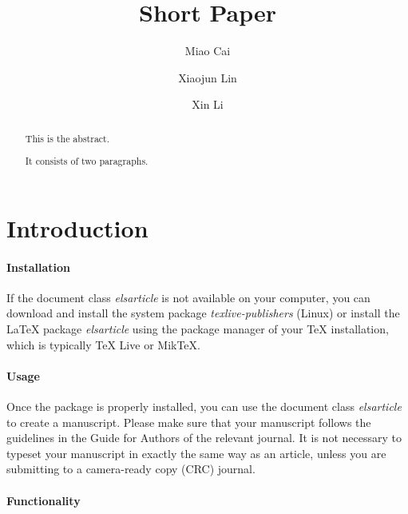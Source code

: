 \documentclass[]{elsarticle} %
\begin{document}
\begin{frontmatter}

  \title{Short Paper}
    \author[SLU]{Miao Cai}
    \author[Sichuan University]{Xiaojun Lin}
  
    \author[Wuhan University]{Xin Li}
  
      \address[SLU]{Saint Louis University, Saint Louis, MO, 63108}
    \address[SCU]{Sichuan University, Chengdu, Sichuan, China}
    \address[WHU]{Wuhan University, Wuhan, Hubei, China}
  
  \begin{abstract}
  This is the abstract.
  
  It consists of two paragraphs.
  \end{abstract}
  
 \end{frontmatter}

\hypertarget{introduction}{%
\section{Introduction}\label{introduction}}

\hypertarget{installation}{%
\paragraph{Installation}\label{installation}}

If the document class \emph{elsarticle} is not available on your computer,
you can download and install the system package \emph{texlive-publishers}
(Linux) or install the LaTeX package \emph{elsarticle} using the package
manager of your TeX installation, which is typically TeX Live or MikTeX.

\hypertarget{usage}{%
\paragraph{Usage}\label{usage}}

Once the package is properly installed, you can use the document class
\emph{elsarticle} to create a manuscript. Please make sure that your
manuscript follows the guidelines in the Guide for Authors of the
relevant journal. It is not necessary to typeset your manuscript in
exactly the same way as an article, unless you are submitting to a
camera-ready copy (CRC) journal.

\hypertarget{functionality}{%
\paragraph{Functionality}\label{functionality}}
\end{document}
